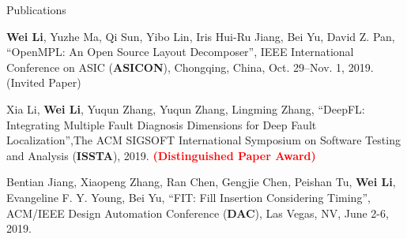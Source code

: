 \begin{rSection}{Publications}
\begin{description}[font=\normalfont]
{}
\item[{[C3]}]{
    \textbf{Wei Li}, Yuzhe Ma, Qi Sun, Yibo Lin, Iris Hui-Ru Jiang, Bei Yu, David Z. Pan,
    ``OpenMPL: An Open Source Layout Decomposer'', IEEE International Conference on ASIC (\textbf{ASICON}), Chongqing, China, Oct. 29–Nov. 1, 2019. {(Invited Paper)}
}
\item[{[C2]}]{
    Xia Li, \textbf{Wei Li}, Yuqun Zhang, Yuqun Zhang, Lingming Zhang, 
    ``DeepFL: Integrating Multiple Fault Diagnosis Dimensions for Deep Fault Localization'',The ACM SIGSOFT International Symposium on Software Testing and Analysis 
      (\textbf{ISSTA}), 2019. \textcolor{red}{\textbf{(Distinguished Paper Award)}}
}
\item[{[C1]}]{
    Bentian Jiang, Xiaopeng Zhang, Ran Chen, Gengjie Chen, Peishan Tu, \textbf{Wei Li}, Evangeline F. Y. Young, Bei Yu, 
    ``FIT: Fill Insertion Considering Timing'', 
    ACM/IEEE Design Automation Conference (\textbf{DAC}), Las Vegas, NV, June 2-6, 2019.
}


\end{description}


\end{rSection}

